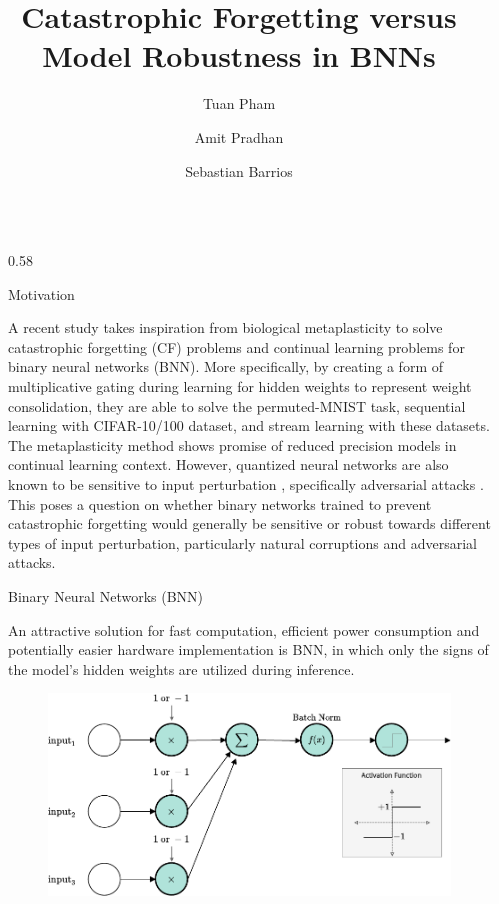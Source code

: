 \documentclass[aspectratio=32, final]{beamer}
\title{Catastrophic Forgetting versus Model Robustness in BNNs}
\author{Tuan Pham \and Amit Pradhan \and Sebastian Barrios}
\institute[shortinst]{\{tuanph18, pradhanak, sbarrios\}@uchicago.edu}
\newlength{\sepwidth}
\newlength{\colwidth}
\newcommand{\separatorcolumn}{\begin{column}{\sepwidth}\end{column}}
\begin{document}
\begin{frame}[t]
\begin{columns}[t]
\separatorcolumn

\begin{column}{0.58\colwidth}

  \begin{block}{Motivation}

    A recent study \cite{Laborieux2021-pv} takes inspiration from biological metaplasticity to solve catastrophic forgetting (CF) problems and continual learning problems for binary neural networks (BNN). More specifically, by creating a form of multiplicative gating during learning for hidden weights to represent weight consolidation, they are able to solve the permuted-MNIST task, sequential learning with CIFAR-10/100 dataset, and stream learning with these datasets. The metaplasticity method shows promise of reduced precision models in continual learning context. However, quantized neural networks are also known to be sensitive to input perturbation \cite{Lin2019-xs}, specifically adversarial attacks \cite{Goodfellow2014-bu}. This poses a question on whether binary networks trained to prevent catastrophic forgetting would generally be sensitive or robust towards different types of input perturbation, particularly natural corruptions \cite{Hendrycks2018-ae} and adversarial attacks. 

  \end{block}

  \begin{alertblock}{Binary Neural Networks (BNN)}

    An attractive solution for fast computation, efficient power consumption and potentially easier hardware implementation is BNN, in which only the signs of the model’s hidden weights are utilized during inference. 
    
    \begin{figure}
        \centering
        \includegraphics[width=0.5\colwidth]{figures/bnn.pdf}
    \end{figure}
    

\end{alertblock}
\end{column}
\end{columns}
\end{frame}
\end{document}
